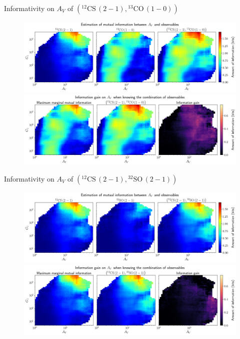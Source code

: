 \documentclass{beamer}
\begin{document}
\begin{frame}{Informativity on $A_V$ of $\left(\mathrm{^{12}CS\,(2-1)},\mathrm{^{13}CO\,(1-0)}\right)$}
    \begin{figure}
        \centering
        \includegraphics[width=0.95\linewidth]{../mi/av__12cs21_13co10_mi.png}
        \vfill
        \includegraphics[width=0.95\linewidth]{../mi/av__12cs21_13co10_mi_gain.png}
    \end{figure}
\end{frame}

\begin{frame}{Informativity on $A_V$ of $\left(\mathrm{^{12}CS\,(2-1)},\mathrm{^{32}SO\,(2-1)}\right)$}
    \begin{figure}
        \centering
        \includegraphics[width=0.95\linewidth]{../mi/av__12cs21_32so21_mi.png}
        \vfill
        \includegraphics[width=0.95\linewidth]{../mi/av__12cs21_32so21_mi_gain.png}
    \end{figure}
\end{frame}
\end{document}
